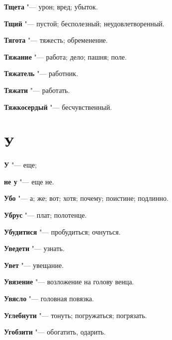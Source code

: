 \begin{mymulticols}{2}
\noindent\textbf{Тщета} "--- урон; вред; убыток. 




\noindent\textbf{Тщий} "--- пустой; бесполезный; неудовлетворенный. 




\noindent\textbf{Тягота} "--- тяжесть; обременение. 




\noindent\textbf{Тяжание} "--- работа; дело; пашня; поле. 




\noindent\textbf{Тяжатель} "--- работник. 




\noindent\textbf{Тяжати} "--- работать. 




\noindent\textbf{Тяжкосердый} "--- бесчувственный. 




\section{У}





\noindent\textbf{У} "--- еще; 




\noindent\textbf{не у} "--- еще не. 




\noindent\textbf{Убо} "--- а; же; вот; хотя; почему; поистине; подлинно. 




\noindent\textbf{Убрус} "--- плат; полотенце. 




\noindent\textbf{Убудитися} "--- пробудиться; очнуться. 




\noindent\textbf{Уведети} "--- узнать. 




\noindent\textbf{Увет} "--- увещание. 




\noindent\textbf{Увязение} "--- возложение на голову венца. 




\noindent\textbf{Увясло} "--- головная повязка. 




\noindent\textbf{Углебнути} "--- тонуть; погружаться; погрязать. 




\noindent\textbf{Угобзити} "--- обогатить, одарить. 





\end{mymulticols}
